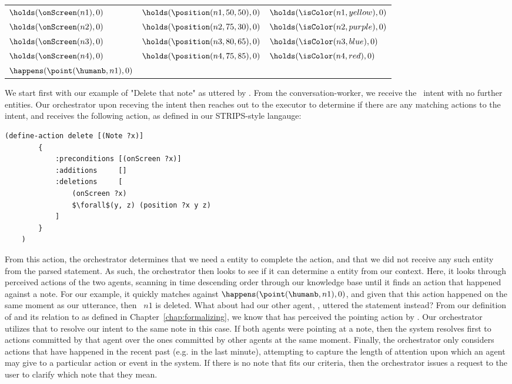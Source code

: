 \begin{center}
\begin{tabular}{ l l l }
    $\holds(\onScreen(n1), 0)$ & 
    $\holds(\position(n1, 50, 50), 0)$ &
    $\holds(\isColor(n1, yellow), 0)$ \\
    $\holds(\onScreen(n2), 0)$ &
    $\holds(\position(n2, 75, 30), 0)$ &
    $\holds(\isColor(n2, purple), 0)$ \\
    $\holds(\onScreen(n3), 0)$ &
    $\holds(\position(n3, 80, 65), 0)$ &
    $\holds(\isColor(n3, blue), 0)$ \\
    $\holds(\onScreen(n4), 0)$ &
    $\holds(\position(n4, 75, 85), 0)$ &
    $\holds(\isColor(n4, red), 0)$ \\
    $\happens(\point(\humanb, n1), 0)$
\end{tabular}
\end{center}

We start first with our example of "Delete that note" as uttered by \humanb. From the conversation-worker,
we receive the \delete\ intent with no further entities. Our orchestrator upon receving the intent then
reaches out to the executor to determine if there are any matching actions to the intent, and receives
the following action, as defined in our STRIPS-style langauge:


\begin{lstlisting}[caption=delete,mathescape=true]
    (define-action delete [(Note ?x)]
        {
            :preconditions [(onScreen ?x)]
            :additions     []
            :deletions     [
                (onScreen ?x)
                $\forall$(y, z) (position ?x y z)
            ]
        }
    )
\end{lstlisting}

From this action, the orchestrator determines that we need a \Note entity to complete the
action, and that we did not receive any such entity from the parsed statement. As such,
the orchestrator then looks to see if it can determine a \Note entity from our context. Here,
it looks through perceived actions of the two agents, scanning in time descending order through
our knowledge base until it finds an action that happened against a note. For our example, it
quickly matches against $\happens(\point(\humanb, n1), 0)$, and given that this action happened
on the same moment as our utterance, then \Note\ $n1$ is deleted. What about had our other agent,
\humana, uttered the statement instead? From our definition of \vicinity and its relation to \perceives
as defined in Chapter~\ref{chap:formalizing}, we know that \humana has perceived the pointing action
by \humanb. Our orchestrator utilizes that to resolve our intent to the same note in this case.
If both agents were pointing at a note, then the system resolves first to actions committed by that
agent over the ones committed by other agents at the same moment. Finally, the orchestrator
only considers actions that have happened in the recent past (e.g. in the last minute), attempting
to capture the length of attention upon which an agent may give to a particular action or event in
the system. If there is no note that fits our criteria, then the orchestrator issues a request
to the user to clarify which note that they mean.

